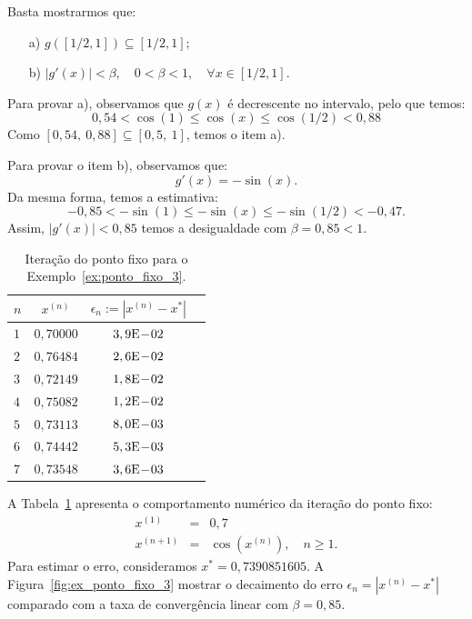 \begin{sol}
  Basta mostrarmos que:
  \begin{enumerate}
  \item[a)] $g\left([1/2,1]\right) \subseteq [1/2,1]$;
  \item[b)] $|g'(x)|<\beta, \quad 0<\beta<1,\quad \forall x\in [1/2,1]$.
  \end{enumerate}

Para provar a), observamos que $g(x)$ é decrescente no intervalo, pelo que temos:
\begin{equation*}
  0,54<\cos(1)\leq \cos(x)\leq \cos(1/2)<0,88
\end{equation*}
Como $[0,54,~0,88]\subseteq [0,5,~1]$, temos o item a).

Para provar o item b), observamos que:
\begin{equation*}
  g'(x) = -\sin(x).
\end{equation*}
Da mesma forma, temos a estimativa:
\begin{equation*}
  -0,85<-\sin(1) \leq -\sin(x)\leq -\sin(1/2)<-0,47.
\end{equation*}
Assim, $|g'(x)|<0,85$ temos a desigualdade com $\beta=0,85<1$.

\begin{table}
  \centering
  \begin{tabular}{l|ccc}\hline
   $n$ & $x^{(n)}$ & $\epsilon_n := |x^{(n)} - x^*|$ \\\hline
   $1$ & $0,70000$ & $3,9\mathrm{E}\!-\!02$ \\
   $2$ & $0,76484$ & $2,6\mathrm{E}\!-\!02$ \\
   $3$ & $0,72149$ & $1,8\mathrm{E}\!-\!02$ \\
   $4$ & $0,75082$ & $1,2\mathrm{E}\!-\!02$ \\
   $5$ & $0,73113$ & $8,0\mathrm{E}\!-\!03$ \\
   $6$ & $0,74442$ & $5,3\mathrm{E}\!-\!03$ \\
   $7$ & $0,73548$ & $3,6\mathrm{E}\!-\!03$ \\\hline
  \end{tabular}
  \caption{Iteração do ponto fixo para o Exemplo~\ref{ex:ponto_fixo_3}.}
  \label{tab:ponto_fixo_3}
\end{table}


A Tabela~\ref{tab:ponto_fixo_3} apresenta o comportamento numérico da iteração do ponto fixo:
\begin{eqnarray*}
x^{(1)} &=& 0,7\\
x^{(n+1)} &=& \cos(x^{(n)}),\quad n\geq 1.
\end{eqnarray*}
Para estimar o erro, consideramos $x^* = 0,7390851605$. A Figura~\ref{fig:ex_ponto_fixo_3} mostrar o decaimento do erro $\epsilon_n = |x^{(n)} - x^*|$ comparado com a taxa de convergência linear com $\beta = 0,85$.


\end{sol}
